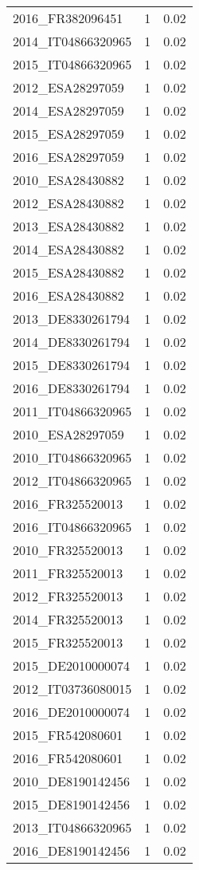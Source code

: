\begin{table*}[htbp]
\begin{tabular}{lrr}
2016_FR382096451 & 1 & 0.02 \\
2014_IT04866320965 & 1 & 0.02 \\
2015_IT04866320965 & 1 & 0.02 \\
2012_ESA28297059 & 1 & 0.02 \\
2014_ESA28297059 & 1 & 0.02 \\
2015_ESA28297059 & 1 & 0.02 \\
2016_ESA28297059 & 1 & 0.02 \\
2010_ESA28430882 & 1 & 0.02 \\
2012_ESA28430882 & 1 & 0.02 \\
2013_ESA28430882 & 1 & 0.02 \\
2014_ESA28430882 & 1 & 0.02 \\
2015_ESA28430882 & 1 & 0.02 \\
2016_ESA28430882 & 1 & 0.02 \\
2013_DE8330261794 & 1 & 0.02 \\
2014_DE8330261794 & 1 & 0.02 \\
2015_DE8330261794 & 1 & 0.02 \\
2016_DE8330261794 & 1 & 0.02 \\
2011_IT04866320965 & 1 & 0.02 \\
2010_ESA28297059 & 1 & 0.02 \\
2010_IT04866320965 & 1 & 0.02 \\
2012_IT04866320965 & 1 & 0.02 \\
2016_FR325520013 & 1 & 0.02 \\
2016_IT04866320965 & 1 & 0.02 \\
2010_FR325520013 & 1 & 0.02 \\
2011_FR325520013 & 1 & 0.02 \\
2012_FR325520013 & 1 & 0.02 \\
2014_FR325520013 & 1 & 0.02 \\
2015_FR325520013 & 1 & 0.02 \\
2015_DE2010000074 & 1 & 0.02 \\
2012_IT03736080015 & 1 & 0.02 \\
2016_DE2010000074 & 1 & 0.02 \\
2015_FR542080601 & 1 & 0.02 \\
2016_FR542080601 & 1 & 0.02 \\
2010_DE8190142456 & 1 & 0.02 \\
2015_DE8190142456 & 1 & 0.02 \\
2013_IT04866320965 & 1 & 0.02 \\
2016_DE8190142456 & 1 & 0.02 \\

\end{tabular}
\end{table*}
